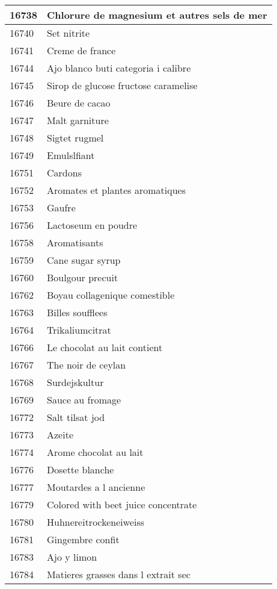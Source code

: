 \begin{longtable}{|l|l|}
16738 & Chlorure de magnesium et autres sels de mer \\ \hline 
16740 & Set nitrite \\ \hline 
16741 & Creme de france \\ \hline 
16744 & Ajo blanco buti categoria i calibre \\ \hline 
16745 & Sirop de glucose fructose caramelise \\ \hline 
16746 & Beure de cacao \\ \hline 
16747 & Malt garniture \\ \hline 
16748 & Sigtet rugmel \\ \hline 
16749 & Emulslfiant \\ \hline 
16751 & Cardons \\ \hline 
16752 & Aromates et plantes aromatiques \\ \hline 
16753 & Gaufre \\ \hline 
16756 & Lactoseum en poudre \\ \hline 
16758 & Aromatisants \\ \hline 
16759 & Cane sugar syrup \\ \hline 
16760 & Boulgour precuit \\ \hline 
16762 & Boyau collagenique comestible \\ \hline 
16763 & Billes soufflees \\ \hline 
16764 & Trikaliumcitrat \\ \hline 
16766 & Le chocolat au lait contient \\ \hline 
16767 & The noir de ceylan \\ \hline 
16768 & Surdejskultur \\ \hline 
16769 & Sauce au fromage \\ \hline 
16772 & Salt tilsat jod \\ \hline 
16773 & Azeite \\ \hline 
16774 & Arome chocolat au lait \\ \hline 
16776 & Dosette blanche \\ \hline 
16777 & Moutardes a l ancienne \\ \hline 
16779 & Colored with beet juice concentrate \\ \hline 
16780 & Huhnereitrockeneiweiss \\ \hline 
16781 & Gingembre confit \\ \hline 
16783 & Ajo y limon \\ \hline 
16784 & Matieres grasses dans l extrait sec \\ \hline 

\end{longtable}
